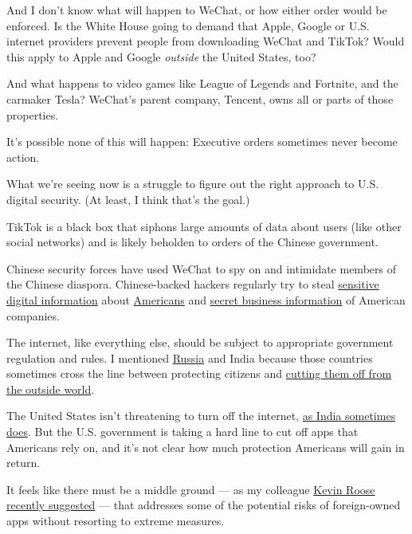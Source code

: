 And I don't know what will happen to WeChat, or how either order would
be enforced. Is the White House going to demand that Apple, Google or
U.S. internet providers prevent people from downloading WeChat and
TikTok? Would this apply to Apple and Google \emph{outside} the United
States, too?

And what happens to video games like League of Legends and Fortnite, and
the carmaker Tesla? WeChat's parent company, Tencent, owns all or parts
of those properties.

It's possible none of this will happen: Executive orders sometimes never
become action.

What we're seeing now is a struggle to figure out the right approach to
U.S. digital security. (At least, I think that's the goal.)

TikTok is a black box that siphons large amounts of data about users
(like other social networks) and is likely beholden to orders of the
Chinese government.

Chinese security forces have used WeChat to spy on and intimidate
members of the Chinese diaspora. Chinese-backed hackers regularly try to
steal
\href{https://www.nytimes3xbfgragh.onion/2015/06/05/us/breach-in-a-federal-computer-system-exposes-personnel-data.html}{sensitive
digital information} about
\href{https://www.nytimes3xbfgragh.onion/2020/02/10/us/politics/equifax-hack-china.html}{Americans}
and
\href{https://www.nytimes3xbfgragh.onion/2020/07/21/us/politics/china-hacking-coronavirus-vaccine.html}{secret
business information} of American companies.

The internet, like everything else, should be subject to appropriate
government regulation and rules. I mentioned
\href{https://www.nytimes3xbfgragh.onion/2018/04/18/world/europe/russia-telegram-shutdown.html}{Russia}
and India because those countries sometimes cross the line between
protecting citizens and
\href{https://www.nytimes3xbfgragh.onion/2019/02/14/technology/india-internet-censorship.html}{cutting
them off from the outside world}.

The United States isn't threatening to turn off the internet,
\href{https://www.nytimes3xbfgragh.onion/2020/01/26/world/asia/kashmir-internet-shutdown-india.html}{as
India sometimes does}. But the U.S. government is taking a hard line to
cut off apps that Americans rely on, and it's not clear how much
protection Americans will gain in return.

It feels like there must be a middle ground --- as my colleague
\href{https://www.nytimes3xbfgragh.onion/2020/07/26/technology/tiktok-china-ban-model.html}{Kevin
Roose recently suggested} --- that addresses some of the potential risks
of foreign-owned apps without resorting to extreme measures.

